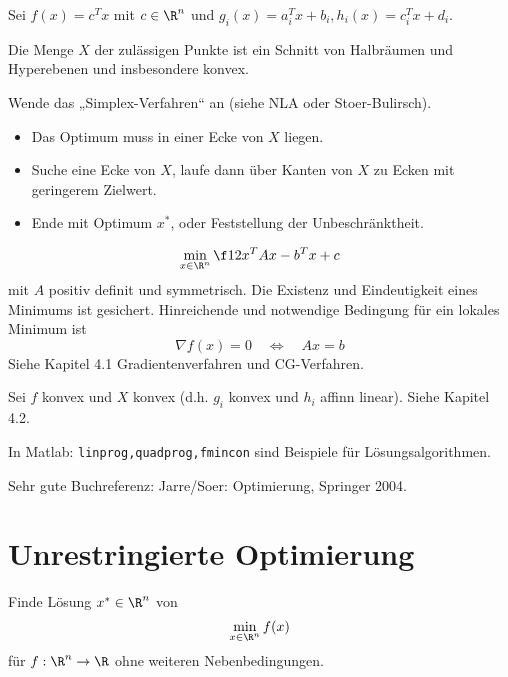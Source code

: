 \documentclass[11pt]{scrbook}
\begin{document}
\begin{seg}
	\begin{description}
		\item[Lineares Optimierungsproblem, „\emph{lineare Programme}“ (LP)]
			Sei $f(x) = c^Tx$ mit $c\in \R^n$ und  $g_i(x) = a_i^Tx + b_i, h_i(x) = c_i^Tx + d_i$.

			Die Menge $X$ der zulässigen Punkte ist ein Schnitt von Halbräumen und Hyperebenen und insbesondere konvex.
			
			Wende das „Simplex-Verfahren“ an (siehe NLA oder Stoer-Bulirsch).
			\begin{itemize}
				\item
					Das Optimum muss in einer Ecke von $X$ liegen.
				\item
					Suche eine Ecke von $X$, laufe dann über Kanten von $X$ zu Ecken mit geringerem Zielwert.
				\item
					Ende mit Optimum $x^*$, oder Feststellung der Unbeschränktheit.
			\end{itemize}
		\item[Unrestringierte Quadratische Optimierung, „\emph{Quadratische Programme}“]
			\[
				\min_{x\in\R^n} \f 12 x^TAx - b^Tx + c 
			\]
			mit $A$ positiv definit und symmetrisch.
			Die Existenz und Eindeutigkeit eines Minimums ist gesichert.
			Hinreichende und notwendige Bedingung für ein lokales Minimum ist
			\[
				\nabla f(x) = 0 \quad \iff \quad Ax = b
			\]
			Siehe Kapitel 4.1 Gradientenverfahren und CG-Verfahren.
		\item[Konvexe Optimierung]
			Sei $f$ konvex und $X$ konvex (d.h. $g_i$ konvex und $h_i$ affinn linear).
			Siehe Kapitel 4.2.
		\item
			In Matlab: \verb|linprog,quadprog,fmincon| sind Beispiele für Lösungsalgorithmen.
		\item
			Sehr gute Buchreferenz: Jarre/Soer: Optimierung, Springer 2004.
	\end{description}
\end{seg}

\section{Unrestringierte Optimierung}

\begin{seg}[Problem]
	Finde Lösung $x^*\in \R^n$ von
	\[
		\min_{x\in\R^n}f(x)
	\]
	für $f: \R^n \to \R$ ohne weiteren Nebenbedingungen.
\end{seg}
\end{document}
